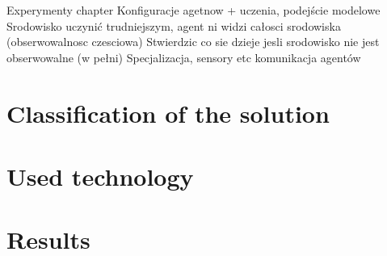 \begin{enumerate}

Experymenty chapter
Konfiguracje agetnow + uczenia, podejście modelowe
Srodowisko uczynić trudniejszym, agent ni widzi całosci srodowiska (obserwowalnosc czesciowa)
Stwierdzic co sie dzieje jesli srodowisko nie jest obserwowalne (w pełni)
Specjalizacja, sensory etc
komunikacja agentów

	
\end{enumerate}

\section{Classification of the solution}

\section{Used technology}


\section{Results} \label{sec:api-detail}



